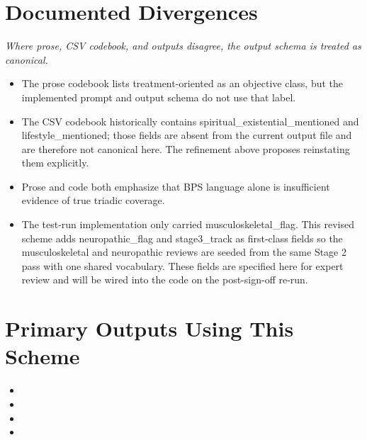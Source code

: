 \documentclass[11pt]{article}
\begin{document}
\section*{Documented Divergences}
{\small\itshape Where prose, CSV codebook, and outputs disagree, the output schema is treated as canonical.}\par\smallskip
\begin{itemize}
\item The prose codebook lists treatment-oriented as an objective class, but the implemented prompt and output schema do not use that label.
\item The CSV codebook historically contains spiritual\_existential\_mentioned and lifestyle\_mentioned; those fields are absent from the current output file and are therefore not canonical here. The refinement above proposes reinstating them explicitly.
\item Prose and code both emphasize that BPS language alone is insufficient evidence of true triadic coverage.
\item The test-run implementation only carried musculoskeletal\_flag. This revised scheme adds neuropathic\_flag and stage3\_track as first-class fields so the musculoskeletal and neuropathic reviews are seeded from the same Stage 2 pass with one shared vocabulary. These fields are specified here for expert review and will be wired into the code on the post-sign-off re-run.
\end{itemize}

\section*{Primary Outputs Using This Scheme}
\begin{itemize}
\item {}
\item {}
\item {}
\item {}
\end{itemize}
\end{document}
